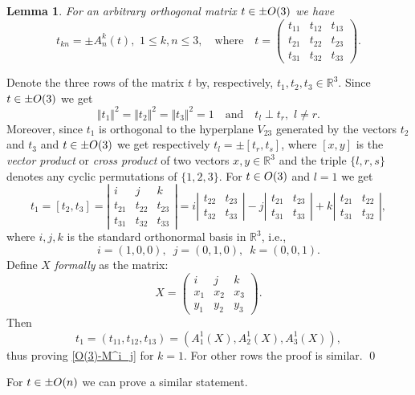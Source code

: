 \documentclass[preprint,12pt]{elsarticle}
\newtheorem{lem}[thm]{Lemma}
\numberwithin{equation}{section}
\begin{document}
%
\begin{lem}
 \label{l.O(3)-M^i_j}
For an  arbitrary  orthogonal matrix $t\in \pm{\rm O}(3)$  
we have 
\begin{equation}
 \label{O(3)-M^i_j} 
 t_{kn}=\pm A^k_n(t),\,\, 1\leq k,n\leq 3,  \quad\text{where}\quad
t=\left(\begin{smallmatrix}
t_{11}&t_{12}&t_{13}\\
t_{21}&t_{22}&t_{23}\\
t_{31}&t_{32}&t_{33}
\end{smallmatrix}
\right).
\end{equation}
\end{lem}
%
\begin{pf}
Denote the three rows of the matrix $t$ 
by, respectively, $t_1,t_2,t_3\in \mathbb R^3$. Since $t\in \pm{\rm O}(3)$ we get
\begin{equation}
\label{O(3)}
\Vert t_1\Vert^2=\Vert t_2\Vert^2=\Vert t_3\Vert^2=1 \quad\text{and} \quad t_l\perp t_r,\,\,l\not=r.
\end{equation}
Moreover, since $t_1$ is orthogonal to the hyperplane $V_{23}$ generated by the vectors $t_2$ and $t_3$ 
and $t\in \pm{\rm O}(3)$  we get respectively $t_l=\pm[t_r,t_s]$, where
$[x,y]$ is the {\it vector product} or {\it cross product}  
of two vectors $x,y\in \mathbb R^3$ and 
the triple  $\{l,r,s\}$ 
denotes any cyclic permutations of $\{1,2,3\}$.
For $t\in {\rm O}(3)$ and $l=1$ we get 
\begin{equation}
\label{[t_2,t_3].3} 
t_1=[t_2,t_3]=
\left|\begin{smallmatrix}
i&j&k\\
t_{21}&t_{22}&t_{23}\\
t_{31}&t_{32}&t_{33}
\end{smallmatrix}\right|=
%
i
\left|\begin{smallmatrix}
t_{22}&t_{23}\\
t_{32}&t_{33}
\end{smallmatrix}\right|-j\left|\begin{smallmatrix}
t_{21}&t_{23}\\
t_{31}&t_{33}
\end{smallmatrix}\right|+k
\left|\begin{smallmatrix}
t_{21}&t_{22}\\
t_{31}&t_{32}
\end{smallmatrix}\right|,
%
\end{equation}
%
where $i,j,k$ is the standard orthonormal basis in $\mathbb R^3$, i.e., 
$$i=(1,0,0),\,\,\,j=(0,1,0),\,\,\,k=(0,0,1).$$  Define  $X$ {\it formally} as the matrix:  
$$
X=\left(\begin{smallmatrix}
i&j&k\\
x_1&x_2&x_3\\
y_1&y_2&y_3
\end{smallmatrix}\right).
$$
Then
$$
t_1=(t_{11},t_{12},t_{13})=\left(A^1_1(X),A^1_2(X),A^1_3(X)\right),
$$
thus proving \eqref{O(3)-M^i_j} for $k=1$. For other rows the proof is similar.
\qed\end{pf}
%
\begin{rem}
\label{O(n)}
For $t\in \pm{\rm O}(n)$ we can prove a similar statement.
\end{rem}
%
\end{document}
